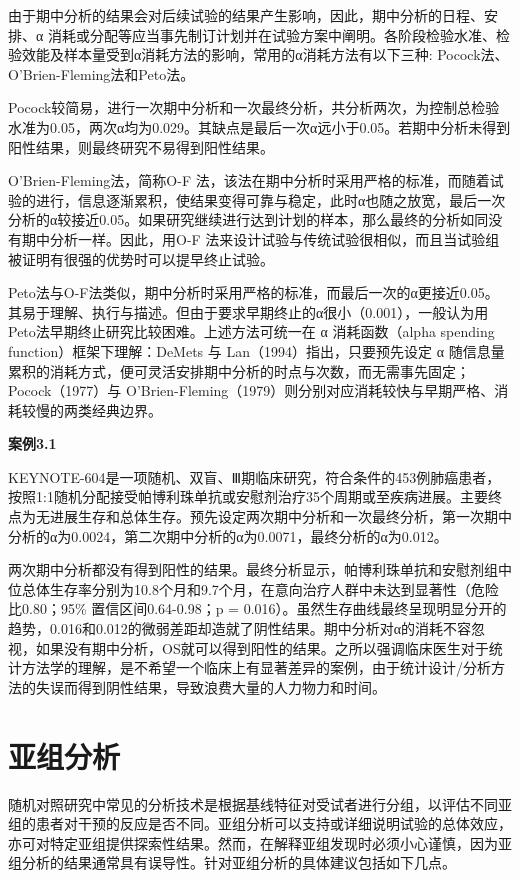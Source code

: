\documentclass[
  chinese-hans,
  letterpaper,
  DIV=11,
  numbers=noendperiod]{scrreprt}
\begin{document}
由于期中分析的结果会对后续试验的结果产生影响，因此，期中分析的日程、安排、α
消耗或分配等应当事先制订计划并在试验方案中阐明。各阶段检验水准、检验效能及样本量受到α消耗方法的影响，常用的α消耗方法有以下三种:
Pocock法、O'Brien-Fleming法和Peto法。

Pocock较简易，进行一次期中分析和一次最终分析，共分析两次，为控制总检验水准为0.05，两次α均为0.029。其缺点是最后一次α远小于0.05。若期中分析未得到阳性结果，则最终研究不易得到阳性结果。

O'Brien-Fleming法，简称O-F
法，该法在期中分析时采用严格的标准，而随着试验的进行，信息逐渐累积，使结果变得可靠与稳定，此时α也随之放宽，最后一次分析的α较接近0.05。如果研究继续进行达到计划的样本，那么最终的分析如同没有期中分析一样。因此，用O-F
法来设计试验与传统试验很相似，而且当试验组被证明有很强的优势时可以提早终止试验。

Peto法与O-F法类似，期中分析时采用严格的标准，而最后一次的α更接近0.05。其易于理解、执行与描述。但由于要求早期终止的α很小（0.001），一般认为用Peto法早期终止研究比较困难。上述方法可统一在
α 消耗函数（alpha spending function）框架下理解：DeMets 与
Lan（1994）指出，只要预先设定 α
随信息量累积的消耗方式，便可灵活安排期中分析的时点与次数，而无需事先固定；Pocock（1977）与
O'Brien-Fleming（1979）则分别对应消耗较快与早期严格、消耗较慢的两类经典边界。

\textbf{案例3.1}

KEYNOTE-604是一项随机、双盲、Ⅲ期临床研究，符合条件的453例肺癌患者，按照1:1随机分配接受帕博利珠单抗或安慰剂治疗35个周期或至疾病进展。主要终点为无进展生存和总体生存。预先设定两次期中分析和一次最终分析，第一次期中分析的α为0.0024，第二次期中分析的α为0.0071，最终分析的α为0.012。

两次期中分析都没有得到阳性的结果。最终分析显示，帕博利珠单抗和安慰剂组中位总体生存率分别为10.8个月和9.7个月，在意向治疗人群中未达到显著性（危险比0.80；95\%
置信区间0.64-0.98；p =
0.016）。虽然生存曲线最终呈现明显分开的趋势，0.016和0.012的微弱差距却造就了阴性结果。期中分析对α的消耗不容忽视，如果没有期中分析，OS就可以得到阳性的结果。之所以强调临床医生对于统计方法学的理解，是不希望一个临床上有显著差异的案例，由于统计设计/分析方法的失误而得到阴性结果，导致浪费大量的人力物力和时间。

\section{亚组分析}\label{ux4e9aux7ec4ux5206ux6790}

随机对照研究中常见的分析技术是根据基线特征对受试者进行分组，以评估不同亚组的患者对干预的反应是否不同。亚组分析可以支持或详细说明试验的总体效应，亦可对特定亚组提供探索性结果。然而，在解释亚组发现时必须小心谨慎，因为亚组分析的结果通常具有误导性。针对亚组分析的具体建议包括如下几点。
\end{document}
